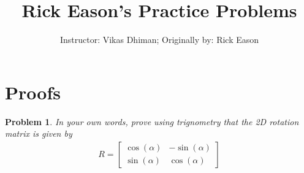 \documentclass{article}
\title{Rick Eason's Practice Problems}
\author{Instructor: Vikas Dhiman; Originally by: Rick Eason}
\newtheorem{prob}{Problem}
\numberwithin{prob}{section}
\begin{document}
\maketitle


\section{Proofs}
\begin{prob}
  In your own words, prove using trignometry that the 2D rotation matrix is given by 
  \begin{align}
    R = \begin{bmatrix}
      \cos(\alpha) & - \sin(\alpha) \\
      \sin(\alpha) & \cos(\alpha)
    \end{bmatrix}
  \end{align}
\end{prob}
\end{document}
